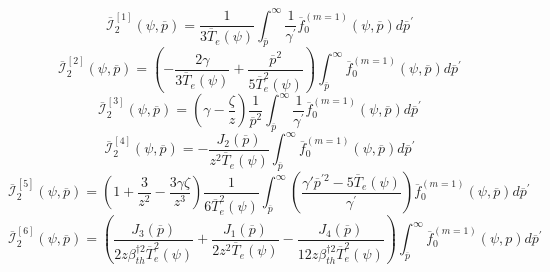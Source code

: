 \begin{equation}
\overline{\mathcal{I}}_{2}^{\left[ 1\right] }\left( \psi ,\overline{p}%
\right) =\frac{1}{3\overline{T}_{e}\left( \psi \right) }\int_{\overline{p}%
}^{\infty }\frac{1}{\gamma ^{\prime }}\overline{f}_{0}^{\left( m=1\right)
}\left( \psi ,\overline{p}\right) d\overline{p}^{\prime }
\end{equation}
\begin{equation}
\overline{\mathcal{I}}_{2}^{\left[ 2\right] }\left( \psi ,\overline{p}%
\right) =\left( -\frac{2\gamma }{3\overline{T}_{e}\left( \psi \right) }+%
\frac{\overline{p}^{2}}{5\overline{T}_{e}^{2}\left( \psi \right) }\right)
\int_{\overline{p}}^{\infty }\overline{f}_{0}^{\left( m=1\right) }\left(
\psi ,\overline{p}\right) d\overline{p}^{\prime }
\end{equation}
\begin{equation}
\overline{\mathcal{I}}_{2}^{\left[ 3\right] }\left( \psi ,\overline{p}%
\right) =\left( \gamma -\frac{\zeta }{z}\right) \frac{1}{\overline{p}^{2}}%
\int_{\overline{p}}^{\infty }\frac{1}{\gamma ^{\prime }}\overline{f}%
_{0}^{\left( m=1\right) }\left( \psi ,\overline{p}\right) d\overline{p}
^{\prime }
\end{equation}
\begin{equation}
\overline{\mathcal{I}}_{2}^{\left[ 4\right] }\left( \psi ,\overline{p}%
\right) =-\frac{J_{2}\left( \overline{p}\right) }{z^{2}\overline{T}%
_{e}\left( \psi \right) }\int_{\overline{p}}^{\infty }\overline{f}%
_{0}^{\left( m=1\right) }\left( \psi ,\overline{p}\right) d\overline{p}%
^{\prime }
\end{equation}
\begin{equation}
\overline{\mathcal{I}}_{2}^{\left[ 5\right] }\left( \psi ,\overline{p}%
\right) =\left( 1+\frac{3}{z^{2}}-\frac{3\gamma \zeta }{z^{3}}\right) \frac{1%
}{6\overline{T}_{e}^{2}\left( \psi \right) }\int_{\overline{p}}^{\infty
}\left( \frac{\gamma \prime \overline{p}^{\prime 2}-5\overline{T}_{e}\left(
\psi \right) }{\gamma ^{\prime }}\right) \overline{f}_{0}^{\left( m=1\right)
}\left( \psi ,\overline{p}\right) d\overline{p}^{\prime }
\end{equation}
\begin{equation}
\overline{\mathcal{I}}_{2}^{\left[ 6\right] }\left( \psi ,\overline{p}%
\right) =\left( \frac{J_{3}\left( \overline{p}\right) }{2z\beta _{th}^{\dag
2}\overline{T}_{e}^{2}\left( \psi \right) }+\frac{J_{1}\left( \overline{p}%
\right) }{2z^{2}\overline{T}_{e}\left( \psi \right) }-\frac{J_{4}\left(
\overline{p}\right) }{12z\beta _{th}^{\dag 2}\overline{T}_{e}^{2}\left( \psi
\right) }\right) \int_{\overline{p}}^{\infty }\overline{f}_{0}^{\left(
m=1\right) }\left( \psi ,p\right) d\overline{p}^{\prime }
\end{equation}
